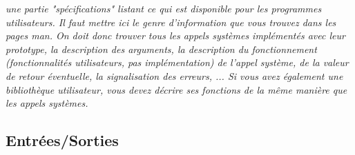 \documentclass{article}
\begin{document}
\textit{
une partie "spécifications" listant ce qui est disponible pour les programmes utilisateurs. Il faut mettre ici le genre d'information que vous trouvez dans les pages man. On doit donc trouver tous les appels systèmes implémentés avec leur prototype, la description des arguments, la description du fonctionnement (fonctionnalités utilisateurs, pas implémentation) de l'appel système, de la valeur de retour éventuelle, la signalisation des erreurs, ... Si vous avez également une bibliothèque utilisateur, vous devez décrire ses fonctions de la même manière que les appels systèmes.
}



\subsection{Entrées/Sorties}
\end{document}
